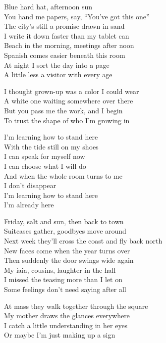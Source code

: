 \begin{lyrics}
Blue hard hat, afternoon sun\\
You hand me papers, say, “You’ve got this one”\\
The city’s still a promise drawn in sand\\
I write it down faster than my tablet can\\
Beach in the morning, meetings after noon\\
Spanish comes easier beneath this room\\
At night I sort the day into a page\\
A little less a visitor with every age

I thought grown-up was a color I could wear\\
A white one waiting somewhere over there\\
But you pass me the work, and I begin\\
To trust the shape of who I’m growing in

I’m learning how to stand here\\
With the tide still on my shoes\\
I can speak for myself now\\
I can choose what I will do\\
And when the whole room turns to me\\
I don’t disappear\\
I’m learning how to stand here\\
I’m already here

Friday, salt and sun, then back to town\\
Suitcases gather, goodbyes move around\\
Next week they’ll cross the coast and fly back north\\
New faces come when the year turns over\\
Then suddenly the door swings wide again\\
My iaia, cousins, laughter in the hall\\
I missed the teasing more than I let on\\
Some feelings don’t need saying after all

At mass they walk together through the square\\
My mother draws the glances everywhere\\
I catch a little understanding in her eyes\\
Or maybe I’m just making up a sign


\end{lyrics}
